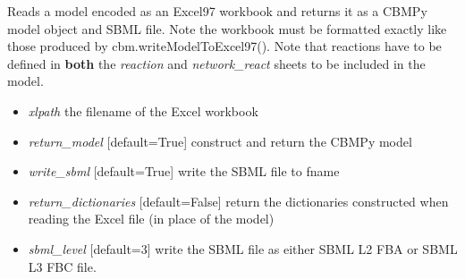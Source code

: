 \documentclass[a4paper,11pt,english]{sphinxmanual}
\begin{document}

\begin{fulllineitems}
\label{modules_doc:cbmpy.CBRead.readExcel97Model}
Reads a model encoded as an Excel97 workbook and returns it as a CBMPy model object and SBML file. Note the workbook must be formatted
exactly like those produced by cbm.writeModelToExcel97(). Note that reactions have to be defined in \textbf{both} the \emph{reaction}
and \emph{network\_react} sheets to be included in the model.
\begin{itemize}
\item {} 
\emph{xlpath} the filename of the Excel workbook

\item {} 
\emph{return\_model} {[}default=True{]} construct and return the CBMPy model

\item {} 
\emph{write\_sbml} {[}default=True{]} write the SBML file to fname

\item {} 
\emph{return\_dictionaries} {[}default=False{]} return the dictionaries constructed when reading the Excel file (in place of the model)

\item {} 
\emph{sbml\_level} {[}default=3{]} write the SBML file as either SBML L2 FBA or SBML L3 FBC file.

\end{itemize}

\end{fulllineitems}

\end{document}
